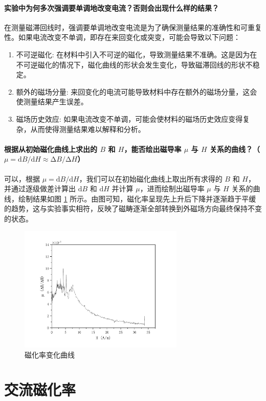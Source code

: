 \documentclass[a4paper,utf8]{article}
\begin{document}
\subsection{实验中为何多次强调要单调地改变电流？否则会出现什么样的结果？}
在测量磁滞回线时，强调要单调地改变电流是为了确保测量结果的准确性和可重复性。如果电流改变不单调，即存在来回变化或突变，可能会导致以下问题：
\begin{enumerate}
    \item 不可逆磁化: 在材料中引入不可逆的磁化，导致测量结果不准确。这是因为在不可逆磁化的情况下，磁化曲线的形状会发生变化，导致磁滞回线的形状不稳定。
    \item 额外的磁场分量: 来回变化的电流可能导致材料中存在额外的磁场分量，这会使测量结果产生误差。
    \item 磁场历史效应: 如果电流改变不单调，可能会使材料的磁场历史效应变得复杂，从而使得测量结果难以解释和分析。
\end{enumerate}
\subsection{根据从初始磁化曲线上求出的 $B$ 和 $H$，能否绘出磁导率 $\mu$ 与 $H$ 关系的曲线？（$\mu=\mathrm{d}B/\mathrm{d}H\approx \mathrm{\Delta}B/\mathrm{\Delta}H$）}
可以，根据 $\mu=\mathrm{d}B/\mathrm{d}H$，我们可以在初始磁化曲线上取出所有求得的 $B$ 和 $H$，并通过逐级做差计算出 $\mathrm{d}B$ 和 $\mathrm{d}H$ 并计算 $\mu$，进而绘制出磁导率 $\mu$ 与 $H$ 关系的曲线，绘制结果如图 \ref{fig:1d} 所示。由图可知，磁化率呈现先上升后下降并逐渐趋于平缓的趋势，这与实验事实相符，反映了磁畴逐渐全部转换到外磁场方向最终保持不变的状态。
\begin{figure}[!ht]
    \caption{磁化率变化曲线\label{fig:1d}}
    \includegraphics[width=0.7\textwidth]{wjj/fig1d.pdf}
\end{figure}
\part{交流磁化率}
\setcounter{section}{0}
\end{document}
